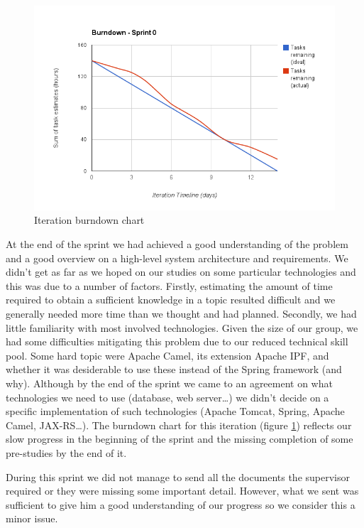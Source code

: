 \begin{figure}
\centering
\includegraphics[scale=0.60]{../Figures/burndownSprint0.png}
\caption{Iteration burndown chart}
\label{figure:burndownsprint0}
\end{figure}

At the end of the sprint we had achieved a good understanding of the problem and a good overview on a high-level system architecture and requirements. 
We didn't get as far as we hoped on our studies on some particular technologies and this was due to a number of factors. 
Firstly, estimating the amount of time required to obtain a sufficient knowledge in a topic resulted difficult and we generally needed more time than we thought and had planned.
Secondly, we had little familiarity with most involved technologies.
Given the size of our group, we had some difficulties mitigating this problem due to our reduced technical skill pool. 
Some hard topic were Apache Camel, its extension Apache IPF, and whether it was desiderable to use these instead of the Spring framework (and why).
Although by the end of the sprint we came to an agreement on what technologies we need to use (database, web server\ldots) we didn't decide on a specific implementation of such technologies (Apache Tomcat, Spring, Apache Camel, JAX-RS\ldots). 
The burndown chart for this iteration (figure \ref{figure:burndownsprint0}) reflects our slow progress in the beginning of the sprint and the missing completion of some pre-studies by the end of it.

During this sprint we did not manage to send all the documents the supervisor required or they were missing some important detail. 
However, what we sent was sufficient to give him a good understanding of our progress so we consider this a minor issue.

